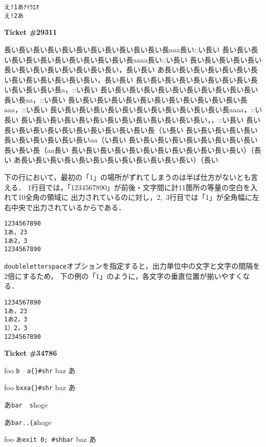 \documentclass{jarticle}
\begin{document}
\begin{lstlisting}
え!1あｱｲｳｴｵ
え!2あ
\end{lstlisting}
\newpage
\textbf{Ticket \#29311}

\begin{env}{\relax}
長い長い長い長い長い長い長い長い長い長い長い長aaa長い::い長い
長い長い長い長い長い長い長い長い長い長い長い長aaaa長い::い長い
長い長い長い長い長い長い長い長い長い長い長い長い長い，長い長い
あ長い長い長い長い長い長い長い長い長い長い長い長い長い，長い長い
長い長い長い長い長い長い長い長い長い長い長い長い長a，::い長い
長い長い長い長い長い長い長い長い長い長い長い長い長aa，::い長い
長い長い長い長い長い長い長い長い長い長い長い長い長aaa，::い長い
長い長い長い長い長い長い長い長い長い長い長い長い長aaaa，::い長い
長い長い長い長い長い長い長い長い長い長い長い長い長い，，::い長い
長い長い長い長い長い長い長い長い長い長い長い長（い長い
長い長い長い長い長い長い長い長い長い長い長いaa（い長い
長い長い長い長い長い長い長い長い長い長い長い長（aa長い
長い長い長い長い長い長い長い長い長い長い長い長い）（長い
あ長い長い長い長い長い長い長い長い長い長い長い長い）（長い
\end{env}

下の行において，最初の「1」の場所がずれてしまうのは半ば仕方がないとも言える．
1行目では，「1234567890」が前後・文字間に計11箇所の等量の空白を入れて10全角の領域に
出力されているのに対し，2,~3行目では「1」が全角幅に左右中央で出力されているからである．
\begin{lstlisting}[basewidth=1em, basicstyle=\tt]
1234567890
1あ，23
1あ2，3
1234567890
\end{lstlisting}

\texttt{doubleletterspace}オプションを指定すると，出力単位中の文字と文字の間隔を2倍にするため，
下の例の「1」のように，各文字の垂直位置が揃いやすくなる．
\begin{lstlisting}[doubleletterspace, basewidth=1em, basicstyle=\tt]
1234567890
1あ，23
1あ2，3
1）2，3
1234567890
\end{lstlisting}


\newpage
\textbf{Ticket \#34786}

foo \lstinline[basicstyle=\tt]!b  a{}#shr! baz あ

foo \lstinline[basicstyle=\tt]!bxxa{}#shr! baz あ

あ\lstinline[basicstyle=\tt]{bar  s}hoge

あ\lstinline[basicstyle=\tt]{bar..{a}hoge

foo \lstinline[basicstyle=\tt\gtfamily]!あexit 0; #shbar! baz あ
\end{document}
